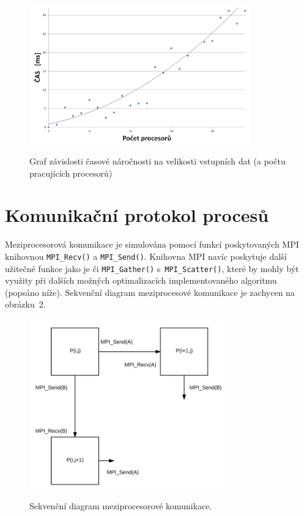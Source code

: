 \documentclass[a4paper,10pt]{article}
\begin{document}
			\begin{figure}[th]
			\centering
			\includegraphics[width=0.85\textwidth]{graferino.PNG}
			\label{fig:graph}
			\caption{Graf závislosti časové náročnosti na velikosti vstupních dat (a počtu pracujících procesorů)}
			\end{figure}	


	\section{Komunikační protokol procesů}
	\label{sec:comprot}
    	\par Meziprocesorová komunikace je simulována pomocí funkcí poskytovaných MPI knihovnou \texttt{MPI\_Recv()} a \texttt{MPI\_Send()}. Knihovna MPI navíc poskytuje další užitečné funkce jako je či \texttt{MPI\_Gather()} s~\texttt{MPI\_Scatter()}, které by mohly být využity při dalších možných optimalizacích implementovaného algoritmu (popsáno níže). Sekvenční diagram meziprocesové komunikace je zachycen na obrázku~2.  %

		\begin{figure}[h!]
    	\centering
    	\includegraphics[width=0.75\textwidth]{sequentino.PNG}
    	\label{fig:sequence-diagram}
    	\caption{Sekvenční diagram meziprocesorové komunikace.}
    	\end{figure}
\end{document}
